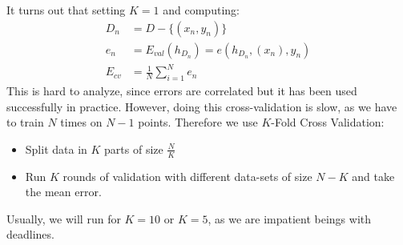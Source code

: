     It turns out that setting $K=1$ and computing:
    \begin{align*}
        D_n &= D - \{(x_n, y_n)\}\\
        e_n &= E_{val}(h_{D_n}) = e(h_{D_n}, (x_n), y_n)\\
        E_{cv} &= \frac{1}{N} \sum_{i=1}^{N} e_n
    \end{align*}
    This is hard to analyze, since errors are correlated but it has been used 
    successfully in practice. However, doing this cross-validation is slow, as 
    we have to train $N$ times on $N-1$ points. Therefore we use $K$-Fold Cross 
    Validation:
    \begin{itemize}
        \item Split data in $K$ parts of size $\frac{N}{K}$
        \item Run $K$ rounds of validation with different data-sets of size 
        $N-K$ and take the mean error.
    \end{itemize}
    Usually, we will run for $K=10$ or $K=5$, as we are impatient beings with 
    deadlines.
